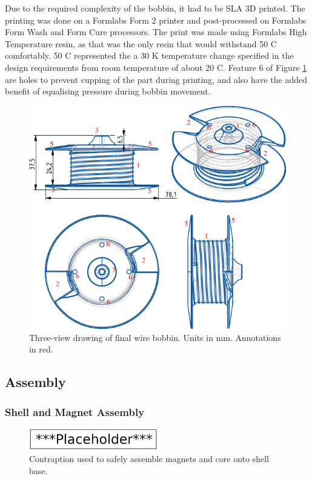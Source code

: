 \documentclass[a4paper,12pt]{article}
\begin{document}
Due to the required complexity of the bobbin, it had to be SLA 3D printed. The printing was done on a Formlabs Form 2 printer and post-processed on Formlabs Form Wash and Form Cure processors. The print was made using Formlabs High Temperature resin, as that was the only resin that would withstand 50 \degree C comfortably. 50 \degree C represented the a 30 K temperature change specified in the design requirements from room temperature of about 20 \degree C. Feature 6 of Figure \ref{fg:bobbin} are holes to prevent cupping of the part during printing, and also have the added benefit of equalising pressure during bobbin movement.

\begin{figure}[h!]
    \centering
    \includegraphics[scale=0.5]{bobbin.png}
    \caption{Three-view drawing of final wire bobbin. Units in mm. Annotations in red.}
    \label{fg:bobbin}
\end{figure}

\subsection{Assembly}

\subsubsection{Shell and Magnet Assembly} \label{section:shellassembly}

\begin{figure}[h!]
    \centering
    \includegraphics[width=0.5\textwidth]{placeholder.png}
    \caption{Contraption used to safely assemble magnets and core onto shell base.}
    \label{fg:assemblingmagnet}
\end{figure}
\end{document}
